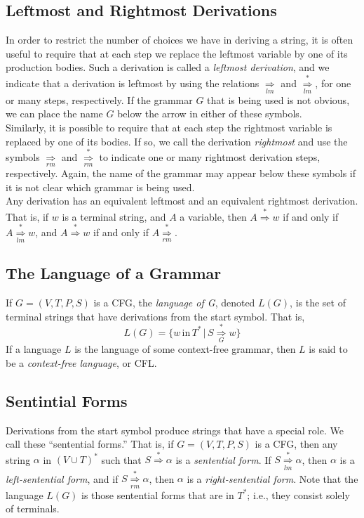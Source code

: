 \documentclass[]{article}
\begin{document}
    \subsection*{Leftmost and Rightmost Derivations}
      In order to restrict the number of choices we have in deriving a string,
      it is often useful to require that at each step we replace the leftmost
      variable by one of its production bodies. Such a derivation is called a
      \emph{leftmost derivation}, and we indicate that a derivation is leftmost
      by using the relations $\underset{lm}{\Rightarrow}$ and $\overset{*}
      {\underset{lm}{\Rightarrow}}$, for one or many steps, respectively. If the
      grammar $G$ that is being used is not obvious, we can place the name $G$
      below the arrow in either of these symbols. \\
      \indent Similarly, it is possible to require that at each step the
      rightmost variable is replaced by one of its bodies. If so, we call the
      derivation \emph{rightmost} and use the symbols
      $\underset{rm}{\Rightarrow}$ and $\overset{*}{\underset{rm}{\Rightarrow}}$
      to indicate one or many rightmost derivation steps, respectively. Again,
      the name of the grammar may appear below these symbols if it is not clear
      which grammar is being used. \\
      \indent Any derivation has an equivalent leftmost and an equivalent
      rightmost derivation. That is, if $w$ is a terminal string, and $A$ a
      variable, then $A \overset{*}{\Rightarrow} w$  if and only if $A
      \overset{*}{\underset{lm}{\Rightarrow}} w$, and
      $A \overset{*}{\Rightarrow} w$ if and only if
      $A \overset{*}{\underset{rm}{\Rightarrow}}$.

    \subsection*{The Language of a Grammar}
      If $G = (V,T,P,S)$ is a CFG, the \emph{language of G}, denoted $L(G)$, is
      the set of terminal strings that have derivations from the start symbol.
      That is,
        \[
          L(G) = \{ w \, \text{in} \, T^* \, | \, S
          \overset{*}{\underset{G}{\Rightarrow}} w \}
        \]
      If a language $L$ is the language of some context-free grammar, then $L$
      is said to be a \emph{context-free language}, or CFL.

    \subsection*{Sentintial Forms}
      Derivations from the start symbol produce strings that have a special
      role. We call these ``sentential forms.'' That is, if $G = (V,T,P,S)$ is a
      CFG, then any string $\alpha$ in $(V \cup T)^*$ such that $S \overset{*}
      {\Rightarrow} \alpha$ is a \emph{sentential form}. If $S \overset{*}
      {\underset{lm}{\Rightarrow}} \alpha$, then $\alpha$ is a
      \emph{left-sentential form}, and if $S \overset{*}{\underset{rm}
      {\Rightarrow}} \alpha$, then $\alpha$ is a \emph{right-sentential form}.
      Note that the language $L(G)$ is those sentential forms that are in $T^*$;
      i.e., they consist solely of terminals.
\end{document}
